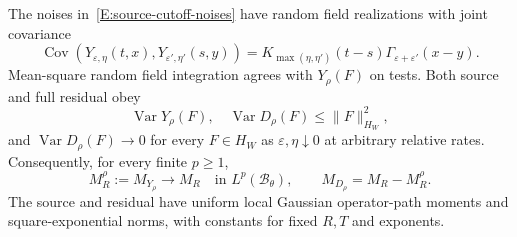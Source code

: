 \begin{proposition}
  \label{P:source-canonical-convergence}
  The noises in~\eqref{E:source-cutoff-noises} have random field realizations
  with joint covariance
  \begin{equation}\label{E:source-joint-covariance}
    \operatorname{Cov}(Y_{\varepsilon,\eta}(t,x),
    Y_{\varepsilon',\eta'}(s,y))
    =K_{\max(\eta,\eta')}(t-s)\Gamma_{\varepsilon+\varepsilon'}(x-y).
  \end{equation}
  Mean-square random field integration agrees with $Y_\rho(F)$ on tests. Both
  source and full residual obey
  \begin{equation}\label{E:source-two-dominations}
    \operatorname{Var}Y_\rho(F),\quad\operatorname{Var}D_\rho(F)
    \le\|F\|_{H_W}^2,
  \end{equation}
  and $\operatorname{Var}D_\rho(F) \to 0$ for every $F \in H_W$ as
  $\varepsilon,\eta\downarrow0$ at arbitrary relative rates. Consequently, for
  every finite $p \ge 1$,
  \begin{equation}\label{E:source-driver-limit}
    M_R^\rho:=M_{Y_\rho}\longrightarrow M_R
    \quad\text{in }L^p(\mathscr{B}_\theta),\qquad
    M_{D_\rho}=M_R-M_R^\rho.
  \end{equation}
  The source and residual have uniform local Gaussian operator-path moments and
  square-exponential norms, with constants for fixed $R,T$ and exponents.
\end{proposition}


